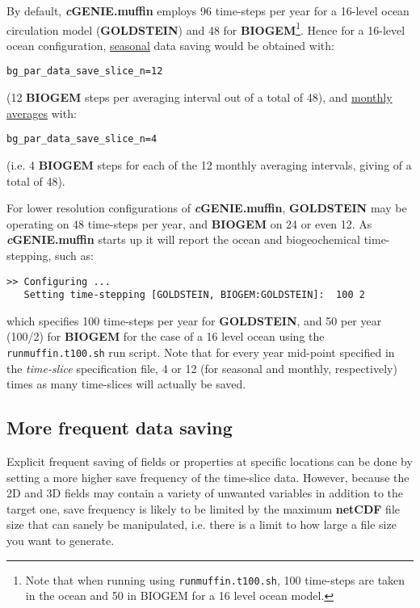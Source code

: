 \documentclass[11pt,fleqn]{book} %
\begin{document}
By default, \textbf{\textit{c}GENIE.muffin} employs 96 time-steps per year for a 16-level ocean circulation model (\textbf{GOLDSTEIN}) and 48 for \textbf{BIOGEM}\footnote{Note that when running using \texttt{runmuffin.t100.sh}, 100 time-steps are taken in the ocean and 50 in BIOGEM for a 16 level ocean model.}. Hence for a 16-level ocean configuration, \uline{seasonal} data saving would be obtained with:
\begin{verbatim}bg_par_data_save_slice_n=12\end{verbatim}
(12 \textbf{BIOGEM} steps per averaging interval out of a total of 48), and \uline{monthly averages} with:
\begin{verbatim}bg_par_data_save_slice_n=4\end{verbatim}
(i.e. 4 \textbf{BIOGEM} steps for each of the 12 monthly averaging intervals, giving of a total of 48).

For lower resolution configurations of \textbf{\textit{c}GENIE.muffin}, \textbf{GOLDSTEIN} may be operating on 48 time-steps per year, and \textbf{BIOGEM} on 24 or even 12. As \textbf{\textit{c}GENIE.muffin} starts up it will report the ocean and biogeochemical time-stepping, such as:
\small\begin{verbatim}
>> Configuring ...
   Setting time-stepping [GOLDSTEIN, BIOGEM:GOLDSTEIN]:  100 2
\end{verbatim}\normalsize
which specifies 100 time-steps per year for \textbf{GOLDSTEIN}, and 50 per year (100/2) for \textbf{BIOGEM} for the case of a 16 level ocean using the \texttt{runmuffin.t100.sh} run script.
Note that for every year mid-point specified in the\textit{ time-slice} specification file, 4 or 12 (for seasonal and monthly, respectively) times as many time-slices will actually be saved.

%
\subsection{More frequent data saving}

Explicit frequent saving of fields or properties at specific locations can be done by setting a more higher save frequency of the time-slice data. However, because the 2D and 3D fields may contain a variety of unwanted variables in addition to the target one, save frequency is likely to be limited by the maximum \textbf{netCDF} file size that can sanely be manipulated, i.e. there is a limit to how large a file size you want to generate.
\end{document}
